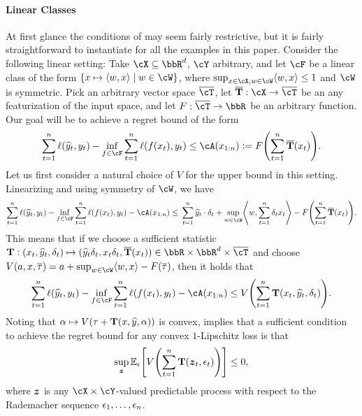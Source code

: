 \paragraph{Linear Classes}
At first glance the conditions of  may seem fairly restrictive, but it is fairly straightforward to instantiate for all the examples in this paper. Consider the following linear setting: Take $\cX\subseteq{}\bbR^{d}$, $\cY$ arbitrary, and let $\cF$ be a linear class of the form $\crl*{x\mapsto{}\tri*{w,x}\mid{}w\in\cW}$, where $\sup_{x\in\cX,w\in\cW}\tri*{w,x}\leq{}1$ and $\cW$ is symmetric. Pick an arbitrary vector space $\overline{\cT}$, let $\overline{\suff}:\cX\to\overline{\cT}$ be an any featurization of the input space, and let $F:\overline{\cT}\to\bbR$ be an arbitrary function. Our goal will be to achieve a regret bound of the form 
\begin{equation}
\label{eq:suff_example}
\sum_{t=1}^{n}\ls(\yh_t, y_t) - \inf_{f\in\cF}\sum_{t=1}^n \loss(f(x_t),y_t)\leq{} \cA(\xr[n]) \ldef F\prn*{\sum_{t=1}^{n}\overline{\suff}(x_t)}.
\end{equation}
Let us first consider a natural choice of $V$ for the upper bound in this setting. Linearizing and using symmetry of $\cW$, we have
\[
\sum_{t=1}^{n}\ls(\yh_t, y_t) - \inf_{f\in\cF}\sum_{t=1}^n \loss(f(x_t),y_t) - \cA(\xr[n])
\leq{} \sum_{t=1}^{n}\yh_t\cdot\dl_t + \sup_{w\in\cW}\tri*{w,\sum_{t=1}^{n}\dl_{t}x_t} - F\prn*{\sum_{t=1}^{n}\overline{\suff}(x_t)}.
\]
This means that if we choose a sufficient statistic $\suff: (x_t, \yh_t, \dl_{t})\mapsto{} (\yh_t\dl_t, x_t\dl_t, \overline{\suff}(x_t))\in{}\bbR\times{}\bbR^{d}\times{}\overline{\cT}$ and choose $V(a, x, \overline{\tau})=a + \sup_{w\in\cW}\tri*{w,x} - F(\overline{\tau})$, then it holds that
\[
\sum_{t=1}^{n}\ls(\yh_t, y_t) - \inf_{f\in\cF}\sum_{t=1}^n \loss(f(x_t),y_t) - \cA(\xr[n]) \leq{} V\prn*{\sum_{t=1}^{n}\suff(x_t, \yh_t, \dl_t)}.
\]
Noting that $\alpha\mapsto{}V(\tau + \mathbf{T}(x, {\widehat{y}}, \alpha))$ is convex,  implies that a sufficient condition to achieve the regret bound for any convex $1$-Lipschitz loss is that
\begin{equation}
\label{eq:v_regret}
\sup_{\mb{z}}\En_{\eps}\brk*{V\prn*{\sum_{t=1}^{n}\suff(\mb{z}_t, \eps_t)}}\leq{}0,
\end{equation}
where $\boldsymbol{z}$ is any $\cX\times{}\cY$-valued predictable process with respect to the Rademacher sequence $\epsilon_{1},\ldots,\epsilon_{n}$. 

